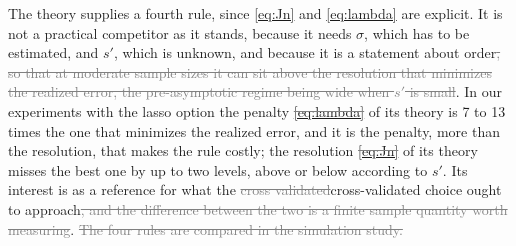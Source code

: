 \documentclass[12pt]{article} %
\theoremstyle{definition}
\theoremstyle{plain}
\newcommand{\seff}{s'}
\begin{document}
The theory supplies a fourth rule, since \eqref{eq:Jn} and \eqref{eq:lambda}
are explicit. It is not a practical competitor as it stands, because it needs
$\sigma$, which has to be estimated, and $\seff$, which is unknown, and
because it is a statement about order\textcolor{gray}{\sout{, so that at moderate sample sizes it can
sit above the resolution that minimizes the realized error, the pre-asymptotic
regime being wide when $\seff$ is small}}\textcolor{colR1}{. In our experiments} \textcolor{colR1}{with the
lasso option} \textcolor{colR1}{the penalty}
\textcolor{gray}{\sout{\mbox{\eqref{eq:lambda}}}} \textcolor{colR1}{of its theory} \textcolor{colR1}{is 7 to 13 times the one that minimizes the realized error,
and it is the penalty, more than the resolution, that makes the rule costly;
the resolution}
\textcolor{gray}{\sout{\mbox{\eqref{eq:Jn}}}} \textcolor{colR1}{of its theory} \textcolor{colR1}{misses the best one by up to two levels, above
or below according to $\seff$}.
Its interest is as a reference for
what the \textcolor{gray}{\sout{cross validated}}\textcolor{colR1}{cross-validated} choice ought to approach\textcolor{gray}{\sout{, and the difference between
the two is a finite sample quantity worth measuring}}.\textcolor{gray}{\sout{ The four rules are
compared in the simulation study.}}
\end{document}
